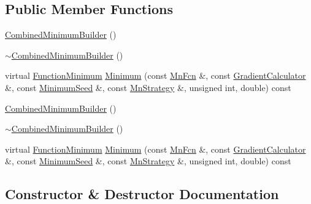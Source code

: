 \subsection*{Public Member Functions}
\begin{DoxyCompactItemize}
\item 
\mbox{\hyperlink{classROOT_1_1Minuit2_1_1CombinedMinimumBuilder_aee1b78ff3ad13105a647bbccd6c92d2e}{Combined\+Minimum\+Builder}} ()
\item 
\mbox{\hyperlink{classROOT_1_1Minuit2_1_1CombinedMinimumBuilder_a50159966d74446223a77e638aad1dd44}{$\sim$\+Combined\+Minimum\+Builder}} ()
\item 
virtual \mbox{\hyperlink{classROOT_1_1Minuit2_1_1FunctionMinimum}{Function\+Minimum}} \mbox{\hyperlink{classROOT_1_1Minuit2_1_1CombinedMinimumBuilder_a44282b6271b536b7fc6b80af16ac67ef}{Minimum}} (const \mbox{\hyperlink{classROOT_1_1Minuit2_1_1MnFcn}{Mn\+Fcn}} \&, const \mbox{\hyperlink{classROOT_1_1Minuit2_1_1GradientCalculator}{Gradient\+Calculator}} \&, const \mbox{\hyperlink{classROOT_1_1Minuit2_1_1MinimumSeed}{Minimum\+Seed}} \&, const \mbox{\hyperlink{classROOT_1_1Minuit2_1_1MnStrategy}{Mn\+Strategy}} \&, unsigned int, double) const
\item 
\mbox{\hyperlink{classROOT_1_1Minuit2_1_1CombinedMinimumBuilder_aee1b78ff3ad13105a647bbccd6c92d2e}{Combined\+Minimum\+Builder}} ()
\item 
\mbox{\hyperlink{classROOT_1_1Minuit2_1_1CombinedMinimumBuilder_a50159966d74446223a77e638aad1dd44}{$\sim$\+Combined\+Minimum\+Builder}} ()
\item 
virtual \mbox{\hyperlink{classROOT_1_1Minuit2_1_1FunctionMinimum}{Function\+Minimum}} \mbox{\hyperlink{classROOT_1_1Minuit2_1_1CombinedMinimumBuilder_a5439a04b01ff94a8f790443b867d6e53}{Minimum}} (const \mbox{\hyperlink{classROOT_1_1Minuit2_1_1MnFcn}{Mn\+Fcn}} \&, const \mbox{\hyperlink{classROOT_1_1Minuit2_1_1GradientCalculator}{Gradient\+Calculator}} \&, const \mbox{\hyperlink{classROOT_1_1Minuit2_1_1MinimumSeed}{Minimum\+Seed}} \&, const \mbox{\hyperlink{classROOT_1_1Minuit2_1_1MnStrategy}{Mn\+Strategy}} \&, unsigned int, double) const
\end{DoxyCompactItemize}


\subsection{Constructor \& Destructor Documentation}
\mbox{\label{classROOT_1_1Minuit2_1_1CombinedMinimumBuilder_aee1b78ff3ad13105a647bbccd6c92d2e}} 
